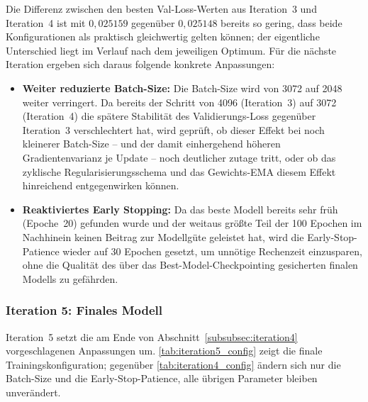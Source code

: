 Die Differenz zwischen den besten Val-Loss-Werten aus Iteration~3 und Iteration~4 ist mit $0{,}025159$ gegenüber $0{,}025148$ bereits so gering, dass beide Konfigurationen als praktisch gleichwertig gelten können; der eigentliche Unterschied liegt im Verlauf nach dem jeweiligen Optimum. Für die nächste Iteration ergeben sich daraus folgende konkrete Anpassungen:

\begin{itemize}
    \item \textbf{Weiter reduzierte Batch-Size:} Die Batch-Size wird von 3072 auf 2048 weiter verringert. Da bereits der Schritt von 4096 (Iteration~3) auf 3072 (Iteration~4) die spätere Stabilität des Validierungs-Loss gegenüber Iteration~3 verschlechtert hat, wird geprüft, ob dieser Effekt bei noch kleinerer Batch-Size -- und der damit einhergehend höheren Gradientenvarianz je Update -- noch deutlicher zutage tritt, oder ob das zyklische Regularisierungsschema und das Gewichts-EMA diesem Effekt hinreichend entgegenwirken können.
    \item \textbf{Reaktiviertes Early Stopping:} Da das beste Modell bereits sehr früh (Epoche~20) gefunden wurde und der weitaus größte Teil der 100 Epochen im Nachhinein keinen Beitrag zur Modellgüte geleistet hat, wird die Early-Stop-Patience wieder auf 30 Epochen gesetzt, um unnötige Rechenzeit einzusparen, ohne die Qualität des über das Best-Model-Checkpointing gesicherten finalen Modells zu gefährden.
\end{itemize}

\subsubsection{Iteration 5: Finales Modell}
\label{subsubsec:iteration5}

Iteration~5 setzt die am Ende von Abschnitt~\ref{subsubsec:iteration4} vorgeschlagenen Anpassungen um. \autoref{tab:iteration5_config} zeigt die finale Trainingskonfiguration; gegenüber \autoref{tab:iteration4_config} ändern sich nur die Batch-Size und die Early-Stop-Patience, alle übrigen Parameter bleiben unverändert.

